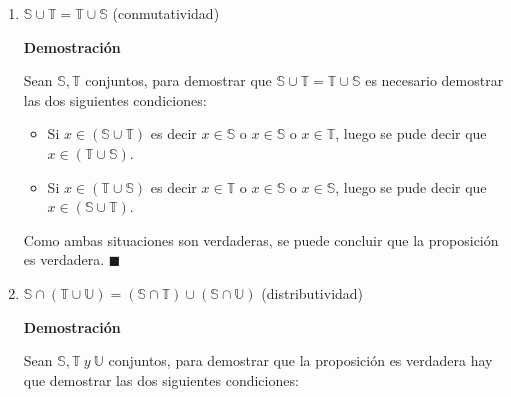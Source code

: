 \documentclass[a4paper,dvipsnames]{book}
\begin{document}
            \begin{enumerate}

                \item $\mathbb S\cup \mathbb T= \mathbb T\cup \mathbb S$
                    (conmutatividad)

                    \textbf{Demostración}

                    Sean $\mathbb S,\mathbb T$ conjuntos, para demostrar que
                    $\mathbb S\cup \mathbb T= \mathbb T\cup \mathbb S$ es
                    necesario demostrar las dos siguientes condiciones:

                    \begin{itemize}
                        \item Si $x\in(\mathbb S\cup \mathbb T)$ es decir $x\in
                            \mathbb S$ o $x\in \mathbb S$ o $x\in \mathbb T$,
                            luego se pude decir que $x\in(\mathbb T\cup \mathbb
                            S)$.

                        \item Si $x\in(\mathbb T\cup \mathbb S)$ es decir $x\in
                            \mathbb T$ o $x\in \mathbb S$ o $x\in \mathbb S$,
                            luego se pude decir que $x\in(\mathbb S\cup \mathbb
                            T)$.
                    \end{itemize}

                    Como ambas situaciones son verdaderas, se puede concluir
                    que la proposición es verdadera. $\blacksquare$


                \item $\mathbb S\cap(\mathbb T\cup \mathbb U)=(\mathbb S\cap
                    \mathbb T)\cup(\mathbb S\cap \mathbb U)$ (distributividad)

                    \textbf{Demostración}

                    Sean $\mathbb S, \mathbb T\ y\ \mathbb U$ conjuntos, para
                    demostrar que la proposición es verdadera hay que demostrar
                    las dos siguientes condiciones:


\end{enumerate}
\end{document}
